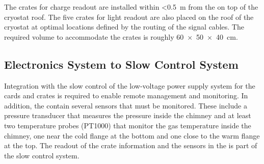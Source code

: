 The  crates for charge readout are installed within \SI{<0.5}{\meter} from the  on top of the cryostat roof. The five  crates for light readout are also placed on the roof of the cryostat at optimal locations defined by the routing of the  signal cables. The required volume to accommodate the crates is roughly \SI[product-units=power]{60x50x40}{\cm}. 

\subsection{Electronics System to Slow Control System}
\label{ssec:dp-tpcelec-intfc-sc}

Integration with the slow control of the low-voltage power supply system for the  cards and  crates is required to enable remote management and monitoring. In addition, the  contain several sensors that must be monitored. These include a pressure transducer that measures the pressure inside the chimney and at least two temperature probes (PT1000) that monitor the gas temperature inside the chimney, one near the cold flange at the bottom and one close to the warm flange at the top. The readout of the  crate information and the sensors in the  is part of the slow control system.
